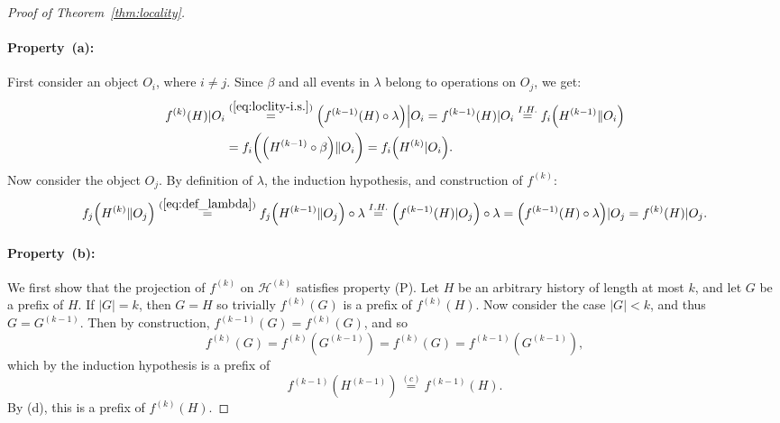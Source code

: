 \documentclass[11pt,letterpaper]{article}
\newcommand{\paren}[1]{{\left({#1}\right)}}
\newcommand{\Bparen}[1]{{\Bigl({#1}\Bigr)}}
\newcommand{\bbparen}[1]{{\biggl({#1}\biggr)}}
\newcommand{\HH}{\mathcal{H}}
\begin{document}
\begin{proof}[Proof of Theorem~\ref{thm:locality}]
\paragraph{Property~(a):}
First consider an object $O_i$, where $i\neq j$.
Since $\beta$ and all events in $\lambda$ belong 
to operations on $O_j$, we get:
\noindent
\begin{displaymath}\begin{split}
 f^{(k)}(H)|O_i
 &\stackrel{(\ref{eq:loclity-i.s.})}{=}
 \Bparen{f^{(k-1)}(H)\circ\lambda}\Big|O_i
 =
 f^{(k-1)}(H)|O_i
 \stackrel{I.H.}{=}
 f_i\paren{H^{(k-1)}\|O_i}
 \\ &=
 f_i\bbparen{\paren{H^{(k-1)}\circ\beta}\|O_i}
 =
 f_i\paren{H^{(k)}|O_i}.
\end{split}\end{displaymath}
Now consider the object $O_j$.
By definition of $\lambda$, the induction hypothesis, and construction of $f^{(k)}$:
\begin{displaymath}\begin{split}
  f_j\paren{H^{(k)}\|O_j}
  \stackrel{(\ref{eq:def_lambda})}{=}
  f_j\paren{H^{(k-1)}\|O_j}\circ\lambda
  \stackrel{I.H.}{=}
  \paren{f^{(k-1)}\paren{H}|O_j}\circ\lambda
  =
  \paren{f^{(k-1)}\paren{H}\circ\lambda}|O_j
  =
  f^{(k)}(H)|O_j.
\end{split}\end{displaymath}


\paragraph{Property~(b):}
We first show that the projection of $f^{(k)}$ on $\HH^{(k)}$ satisfies property (P).
Let $H$ be an arbitrary history of length at most $k$, and let $G$ be a prefix of $H$.
If $|G|=k$, then $G=H$ so trivially $f^{(k)}(G)$ is a prefix of $f^{(k)}(H)$.
Now consider the case $|G|<k$, and thus $G=G^{(k-1)}$.
Then by construction, $f^{(k-1)}(G)=f^{(k)}(G)$, and so
\begin{displaymath}
  f^{(k)}(G)
  =
  f^{(k)}\paren{G^{(k-1)}}
  =
  f^{(k)}(G)
  =
  f^{(k-1)}\paren{G^{(k-1)}},
\end{displaymath}
which by the induction hypothesis is a prefix of
\begin{displaymath}
f^{(k-1)}\paren{H^{(k-1)}}
  \stackrel{(c)}=
  f^{(k-1)}\paren{H}.
\end{displaymath}
By (d), this is a prefix of $f^{(k)}(H)$.


\end{proof}
\end{document}
